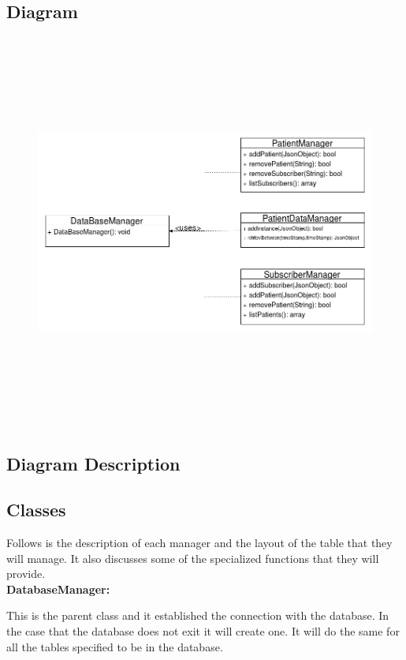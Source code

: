 \subsection*{Diagram}
\begin{center}
\begin{figure}[h]
	\includegraphics[width=15cm, height=13cm]{DataStorage/DataStorage.png}
\end{figure}
\end{center}
\subsection*{Diagram Description}

\subsection*{\textbf{Classes}}
Follows is the description of each manager and the layout of the table that they will manage. It also discusses some of the specialized functions that they will provide.\\

\textbf{DatabaseManager:}

This is the parent class and it established the connection with the database. In the case that the database does not exit it will create one. It will do the same for all the tables specified to be in the database.\\

